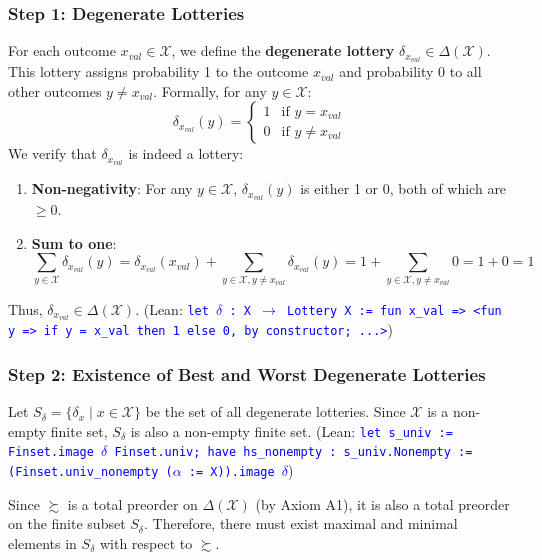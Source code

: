 \documentclass{article}
\theoremstyle{definition}
\newcommand{\X}{\mathcal{X}}
\newcommand{\tactic}[1]{\textcolor{blue}{\texttt{#1}}}
\newcommand{\DeltaX}{\Delta(\X)} %
\newcommand{\pref}{\succsim} %
\begin{document}
\subsubsection{Step 1: Degenerate Lotteries}
For each outcome $x_{val} \in \X$, we define the \textbf{degenerate lottery} $\delta_{x_{val}} \in \DeltaX$. This lottery assigns probability 1 to the outcome $x_{val}$ and probability 0 to all other outcomes $y \neq x_{val}$.
Formally, for any $y \in \X$:
\[ \delta_{x_{val}}(y) = \begin{cases} 1 & \text{if } y = x_{val} \\ 0 & \text{if } y \neq x_{val} \end{cases} \]
We verify that $\delta_{x_{val}}$ is indeed a lottery:
\begin{enumerate}
    \item \textbf{Non-negativity}: For any $y \in \X$, $\delta_{x_{val}}(y)$ is either 1 or 0, both of which are $\ge 0$.
    \item \textbf{Sum to one}:
    \[ \sum_{y \in \X} \delta_{x_{val}}(y) = \delta_{x_{val}}(x_{val}) + \sum_{y \in \X, y \neq x_{val}} \delta_{x_{val}}(y) = 1 + \sum_{y \in \X, y \neq x_{val}} 0 = 1 + 0 = 1 \]
\end{enumerate}
Thus, $\delta_{x_{val}} \in \DeltaX$.
(Lean: \tactic{let  $\delta$ : X $\rightarrow$ Lottery X := fun x\_val => <fun y => if y = x\_val then 1 else 0, by constructor; ...>})

\subsubsection{Step 2: Existence of Best and Worst Degenerate Lotteries}
Let $S_{\delta} = \{ \delta_x \mid x \in \X \}$ be the set of all degenerate lotteries. Since $\X$ is a non-empty finite set, $S_{\delta}$ is also a non-empty finite set.
(Lean: \tactic{let s\_univ := Finset.image $\delta$ Finset.univ; have hs\_nonempty : s\_univ.Nonempty := (Finset.univ\_nonempty ($\alpha$ := X)).image $\delta$})

Since $\pref$ is a total preorder on $\DeltaX$ (by Axiom A1), it is also a total preorder on the finite subset $S_{\delta}$. Therefore, there must exist maximal and minimal elements in $S_{\delta}$ with respect to $\pref$.
\end{document}
